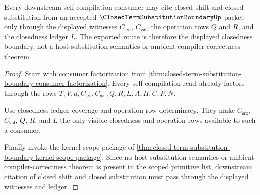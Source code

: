 \begin{theorem}
\label{thm:closed-term-substitution-boundary-closedness-consumer-export}
Every downstream self-compilation consumer may cite closed shift and closed substitution from an accepted $\ClosedTermSubstitutionBoundaryUp$ packet only through the displayed witnesses $C_{\mathsf{src}}$, $C_{\mathsf{val}}$, the operation rows $Q$ and $R$, and the closedness ledger $L$. The exported route is therefore the displayed closedness boundary, not a host substitution semantics or ambient compiler-correctness theorem.
\end{theorem}
\begin{proof}
Start with consumer factorization from \autoref{thm:closed-term-substitution-boundary-consumer-factorization}. Every self-compilation read already factors through the rows $T,V,d,C_{\mathsf{src}},C_{\mathsf{val}},Q,R,L,A,H,C,P,N$.

Use closedness ledger coverage and operation row determinacy. They make $C_{\mathsf{src}}$, $C_{\mathsf{val}}$, $Q$, $R$, and $L$ the only visible closedness and operation rows available to such a consumer.

Finally invoke the kernel scope package of \autoref{thm:closed-term-substitution-boundary-kernel-scope-package}. Since no host substitution semantics or ambient compiler-correctness theorem is present in the scoped primitive list, downstream citation of closed shift and closed substitution must pass through the displayed witnesses and ledger.
\end{proof}

